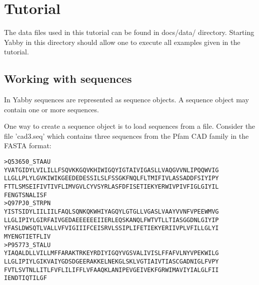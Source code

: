 

\setcounter{section}{0}

\chapter{Tutorial}

The data files used in this tutorial can be found in docs/data/ 
directory. Starting Yabby in this directory should allow one to
execute all examples given in the tutorial.

\section{Working with sequences}


In Yabby sequences are represented as sequence objects. A sequence
object may contain one or more sequences. 

One way to create a sequence object is to load sequences from a
file.  Consider the file 'cad3.seq' which contains three sequences
from the Pfam CAD family in the FASTA format:

\begin{verbatim}
>Q53650_STAAU
YVATGIDYLVILILLFSQVKKGQVKHIWIGQYIGTAIVIGASLLVAQGVVNLIPQQWVIG
LLGLLPLYLGVKIWIKGEEDEDESSILSLFSSGKFNQLFLTMIFIVLASSADDFSIYIPY
FTTLSMSEIFIVTIVFLIMVGVLCYVSYRLASFDFISETIEKYERWIVPIVFIGLGIYIL
FENGTSNALISF
>Q97PJ0_STRPN
YISTSIDYLIILIILFAQLSQNKQKWHIYAGQYLGTGLLVGASLVAAYVVNFVPEEWMVG
LLGLIPIYLGIRFAIVGEDAEEEEEEIIERLEQSKANQLFWTVTLLTIASGGDNLGIYIP
YFASLDWSQTLVALLVFVIGIIIFCEISRVLSSIPLIFETIEKYERIIVPLVFILLGLYI
MYENGTIETFLIV
>P95773_STALU
YIAQALDLLVILLMFFARAKTRKEYRDIYIGQYVGSVALIVISLFFAFVLNYVPEKWILG
LLGLIPIYLGIKVAIYGDSDGEERAKKELNEKGLSKLVGTIAIVTIASCGADNIGLFVPY
FVTLSVTNLLITLFVFLILIFFLVFAAQKLANIPEVGEIVEKFGRWIMAVIYIALGLFII
IENDTIQTILGF
\end{verbatim}

